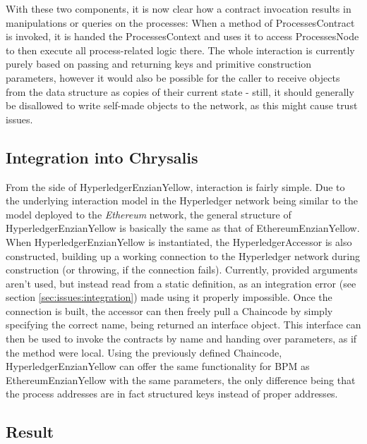 With these two components, it is now clear how a contract invocation results in manipulations or queries on the processes: When a method of ProcessesContract is invoked, it is handed the ProcessesContext and uses it to access ProcessesNode to then execute all process-related logic there. The whole interaction is currently purely based on passing and returning keys and primitive construction parameters, however it would also be possible for the caller to receive objects from the data structure as copies of their current state - still, it should generally be disallowed to write self-made objects to the network, as this might cause trust issues.

\subsection{Integration into Chrysalis}
\label{sec:impr:hl:integration}

From the side of HyperledgerEnzianYellow, interaction is fairly simple. Due to the underlying interaction model in the Hyperledger network being similar to the model deployed to the \emph{Ethereum} network, the general structure of HyperledgerEnzianYellow is basically the same as that of EthereumEnzianYellow. \newline
When HyperledgerEnzianYellow is instantiated, the HyperledgerAccessor is also constructed, building up a working connection to the Hyperledger network during construction (or throwing, if the connection fails). Currently, provided arguments aren't used, but instead read from a static definition, as an integration error (see section \ref{sec:issues:integration}) made using it properly impossible. \newline
Once the connection is built, the accessor can then freely pull a Chaincode by simply specifying the correct name, being returned an interface object. This interface can then be used to invoke the contracts by name and handing over parameters, as if the method were local. Using the previously defined Chaincode, HyperledgerEnzianYellow can offer the same functionality for BPM as EthereumEnzianYellow with the same parameters, the only difference being that the process addresses are in fact structured keys instead of proper addresses.

\subsection{Result}
\label{sec:impr:hl:result}

